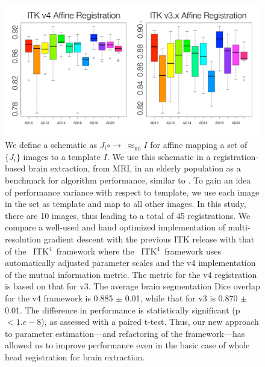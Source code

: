 \documentclass{llncs}
\newcommand{\tk}{~ITK$^{\text{4}}$~}
\begin{document}
\begin{figure}[t]
\begin{center}
\includegraphics[width=4.5in]{figs/evaluation.pdf}
\caption{We define a schematic as $J_i \circ \rightarrow
~\approx_\text{mi} I$ for affine mapping a set of $\{ J_i \}$ images
to a template $I$.  We use this schematic in a registration-based
brain extraction, from MRI, in an elderly population as a benchmark
for algorithm performance, similar to \cite{Klein2010}.  To gain an
idea of performance variance with respect to template, we use each
image in the set as template and map to all other images.  In this
study, there are 10 images, thus leading to a total of 45
registrations.  We compare a well-used and hand optimized
implementation of multi-resolution gradient descent with the previous
ITK release with that of the \tk framework where the \tk framework
uses automatically adjusted parameter scales and the v4 implementation
of the mutual information metric.  The metric for the v4 registration
is based on that for v3.  The average brain segmentation Dice overlap
for the v4 framework is 0.885 $\pm$ 0.01, while that for v3 is 0.870
$\pm$ 0.01.  The difference in performance is statistically
significant (p $< 1.e-8$), as assessed with a paired t-test. Thus, our
new approach to parameter estimation---and refactoring of the
framework---has allowed us to improve performance even in the basic
case of whole head registration for brain extraction.}
\label{fig:eval}
\end{center}
\end{figure}
\end{document}
